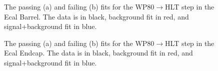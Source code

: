 \begin{thebibliography}{10}
\clearpage

\begin{figure}[htb]
  \begin{center}
    \caption{The passing (a) and failing (b) fits for the WP80$\to$HLT step in the Ecal Barrel.
             The data is in black, background fit in red, and signal+background fit in blue.}
  \end{center}
\end{figure}

\begin{figure}[htb]
  \begin{center}
    \caption{The passing (a) and failing (b) fits for the WP80$\to$HLT step in the Ecal Endcap.
             The data is in black, background fit in red, and signal+background fit in blue.}
  \end{center}
\end{figure}


\end{thebibliography}
